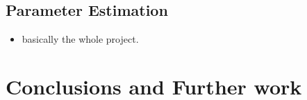 \documentclass[11pt,journal]{./IEEE_latex_class/IEEEtran}
\begin{document}

\subsection{Parameter Estimation}
 \begin{itemize}
\item basically the whole project.
\cite{Isaacs2006}
 \end{itemize}
 
\section{Conclusions and Further work}




\end{document}
